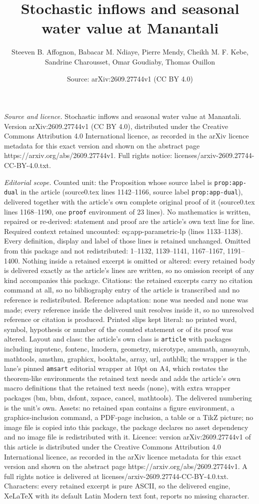 \documentclass[10pt,a4paper]{amsart}
\title[Stochastic inflows and seasonal water value at Manantali]{Stochastic inflows and seasonal water value at Manantali}
\author{Steeven B. Affognon, Babacar M. Ndiaye, Pierre Mendy, Cheikh M. F. Kebe, Sandrine Charousset, Omar Goudiaby, Thomas Ouillon}
\date{Source: arXiv:2609.27744v1 (CC BY 4.0)}
\begin{document}
\maketitle

\noindent\emph{Source and licence.} Stochastic inflows and seasonal water value at Manantali. Version arXiv:2609.27744v1 (CC BY 4.0), distributed under the Creative Commons Attribution 4.0 International licence, as recorded in the arXiv licence metadata for this exact version and shown on the abstract page https://arxiv.org/abs/2609.27744v1. Full rights notice: licenses/arxiv-2609.27744-CC-BY-4.0.txt.\par\smallskip

\noindent\textit{Editorial scope.} Counted unit: the Proposition whose source label is \texttt{prop:app-dual} in the article (source0.tex lines 1142--1166, source label \texttt{prop:app-dual}), delivered together with the article's own complete original proof of it (source0.tex lines 1168--1190, one \texttt{proof} environment of 23 lines). No mathematics is written, repaired or re-derived: statement and proof are the article's own text line for line. Required context retained uncounted: eq:app-parametric-lp (lines 1133--1138). Every definition, display and label of those lines is retained unchanged. Omitted from this package and not redistributed: 1--1132, 1139--1141, 1167--1167, 1191--1400. Nothing inside a retained excerpt is omitted or altered: every retained body is delivered exactly as the article's lines are written, so no omission receipt of any kind accompanies this package. Citations: the retained excerpts carry no citation command at all, so no bibliography entry of the article is transcribed and no reference is redistributed. Reference adaptation: none was needed and none was made; every reference inside the delivered unit resolves inside it, so no unresolved reference or citation is produced. Printed slips kept literal: no printed word, symbol, hypothesis or number of the counted statement or of its proof was altered. Layout and class: the article's own class is \texttt{article} with packages including inputenc, fontenc, lmodern, geometry, microtype, amsmath, amssymb, mathtools, amsthm, graphicx, booktabs, array, url, authblk; the wrapper is the lane's pinned \texttt{amsart} editorial wrapper at 10pt on A4, which restates the theorem-like environments the retained text needs and adds the article's own macro definitions that the retained text needs (none), with extra wrapper packages (bm, bbm, dsfont, xspace, cancel, mathtools). The delivered numbering is the unit's own. Assets: no retained span contains a figure environment, a graphics-inclusion command, a PDF-page inclusion, a table or a TikZ picture; no image file is copied into this package, the package declares no asset dependency and no image file is redistributed with it. Licence: version arXiv:2609.27744v1 of this article is distributed under the Creative Commons Attribution 4.0 International licence, as recorded in the arXiv licence metadata for this exact version and shown on the abstract page https://arxiv.org/abs/2609.27744v1. A full rights notice is delivered at licenses/arxiv-2609.27744-CC-BY-4.0.txt. Characters: every retained excerpt is pure ASCII, so the delivered engine, XeLaTeX with its default Latin Modern text font, reports no missing character.
\end{document}
